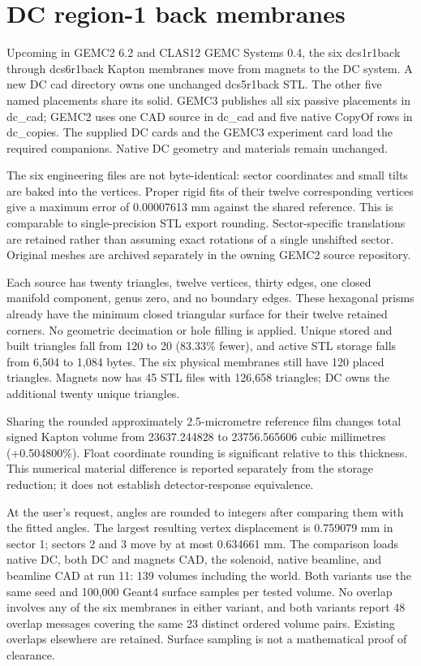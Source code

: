 \FloatBarrier
\section{DC region-1 back membranes}
\label{sec:dc-back}

Upcoming in GEMC2 6.2 and CLAS12 GEMC Systems 0.4, the six dcs1r1back through dcs6r1back Kapton membranes move
from magnets to the DC system. A new DC cad directory owns one unchanged dcs5r1back STL. The other five named
placements share its solid. GEMC3 publishes all six passive placements in dc\_cad; GEMC2 uses one CAD source
in dc\_cad and five native CopyOf rows in dc\_copies. The supplied DC cards and the GEMC3 experiment card load
the required companions. Native DC geometry and materials remain unchanged.

The six engineering files are not byte-identical: sector coordinates and small tilts are baked into the
vertices. Proper rigid fits of their twelve corresponding vertices give a maximum error of 0.00007613 mm
against the shared reference. This is comparable to single-precision STL export rounding. Sector-specific
translations are retained rather than assuming exact rotations of a single unshifted sector. Original meshes
are archived separately in the owning GEMC2 source repository.

Each source has twenty triangles, twelve vertices, thirty edges, one closed manifold component, genus zero,
and no boundary edges. These hexagonal prisms already have the minimum closed triangular surface for their
twelve retained corners. No geometric decimation or hole filling is applied. Unique stored and built triangles
fall from 120 to 20 (83.33\% fewer), and active STL storage falls from 6,504 to 1,084 bytes. The six physical
membranes still have 120 placed triangles. Magnets now has 45 STL files with 126,658 triangles; DC owns the
additional twenty unique triangles.

Sharing the rounded approximately 2.5-micrometre reference film changes total signed Kapton volume from
23637.244828 to 23756.565606 cubic millimetres (+0.504800\%). Float coordinate rounding is significant
relative to this thickness. This numerical material difference is reported separately from the storage
reduction; it does not establish detector-response equivalence.

At the user's request, angles are rounded to integers after comparing them with the fitted angles. The largest
resulting vertex displacement is 0.759079 mm in sector 1; sectors 2 and 3 move by at most 0.634661 mm. The
comparison loads native DC, both DC and magnets CAD, the solenoid, native beamline, and beamline CAD at run
11: 139 volumes including the world. Both variants use the same seed and 100,000 Geant4 surface samples per
tested volume. No overlap involves any of the six membranes in either variant, and both variants report 48
overlap messages covering the same 23 distinct ordered volume pairs. Existing overlaps elsewhere are retained.
Surface sampling is not a mathematical proof of clearance.

